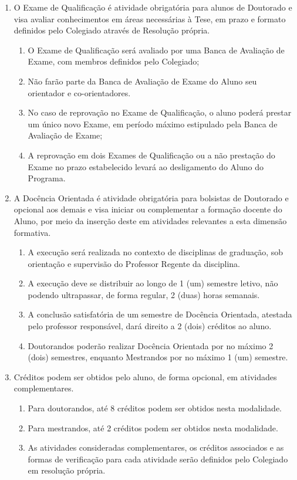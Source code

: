 \documentclass{article}
\newcommand{\grupoMenor}{Colegiado\xspace}
\begin{document}
\begin{enumerate}
	\item  O Exame de Qualificação é atividade obrigatória para alunos de Doutorado e visa avaliar conhecimentos em áreas necessárias à Tese, em prazo e formato definidos pelo \grupoMenor através de Resolução própria.
	\begin{enumerate}
		\item O Exame de Qualificação será avaliado por uma Banca de Avaliação de Exame, com membros definidos pelo \grupoMenor;
		\item Não farão parte da Banca de Avaliação de Exame do Aluno seu orientador e co-orientadores.
		\item No caso de reprovação no Exame de Qualificação, o aluno poderá prestar um único novo Exame, em período máximo estipulado pela Banca de Avaliação de Exame;
		\item A reprovação em dois Exames de Qualificação ou a não prestação do Exame no prazo estabelecido levará ao desligamento do Aluno do Programa.
	\end{enumerate}

	\item A Docência Orientada é atividade obrigatória para bolsistas de Doutorado e opcional aos demais e visa iniciar ou complementar a formação docente do Aluno, por meio da inserção deste em atividades relevantes a esta dimensão formativa.
	\begin{enumerate}
		\item A execução será realizada no contexto de disciplinas de graduação, sob orientação e supervisão do Professor Regente da disciplina.
		\item A execução deve se distribuir ao longo de 1 (um) semestre letivo, não podendo ultrapassar, de forma regular, 2 (duas) horas semanais.
		\item A conclusão satisfatória de um semestre de Docência Orientada, atestada pelo professor responsável, dará direito a 2 (dois) créditos ao aluno.
		\item Doutorandos poderão realizar Docência Orientada por no máximo 2 (dois) semestres, enquanto Mestrandos por no máximo 1 (um) semestre.
	\end{enumerate}

	\item Créditos podem ser obtidos pelo aluno, de forma opcional, em atividades complementares.
	\begin{enumerate}
		\item Para doutorandos, até 8 créditos podem ser obtidos nesta modalidade.
		\item Para mestrandos, até 2 créditos podem ser obtidos nesta modalidade.
		\item As atividades consideradas complementares, os créditos associados e as formas de verificação para cada atividade serão definidos pelo \grupoMenor em resolução própria.
	\end{enumerate}

\end{enumerate}
\end{document}
